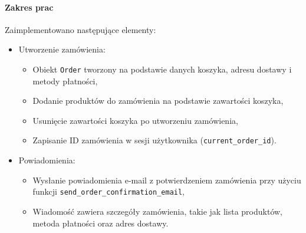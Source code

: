 \documentclass[12pt,a4paper,oneside]{article}
\theoremstyle{definition}
\numberwithin{equation}{section}
\begin{document}
\paragraph{Zakres prac}
Zaimplementowano następujące elementy:
\begin{itemize}
    \item Utworzenie zamówienia:
    \begin{itemize}
        \item Obiekt \texttt{Order} tworzony na podstawie danych koszyka, adresu dostawy i metody płatności,
        \item Dodanie produktów do zamówienia na podstawie zawartości koszyka,
        \item Usunięcie zawartości koszyka po utworzeniu zamówienia,
        \item Zapisanie ID zamówienia w sesji użytkownika (\texttt{current\_order\_id}).
    \end{itemize}
    \item Powiadomienia:
    \begin{itemize}
        \item Wysłanie powiadomienia e-mail z potwierdzeniem zamówienia przy użyciu funkcji \texttt{send\_order\_confirmation\_email},
        \item Wiadomość zawiera szczegóły zamówienia, takie jak lista produktów, metoda płatności oraz adres dostawy.
    \end{itemize}
\end{itemize}
% 
% 
\end{document}
